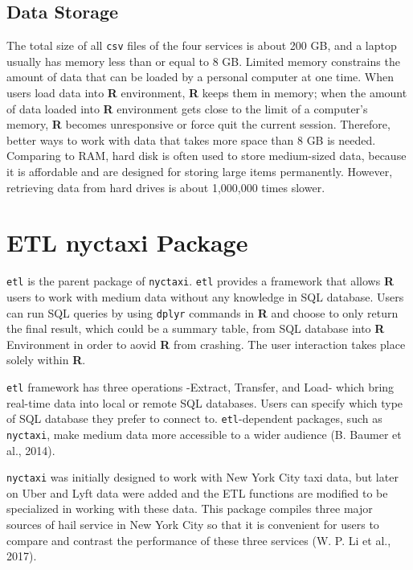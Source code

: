\documentclass[12pt,twoside]{reedthesis}
\theoremstyle{definition}
\theoremstyle{definition}
\theoremstyle{definition}
\theoremstyle{remark}
\begin{document}
\subsection{Data Storage}\label{data-storage}

The total size of all \texttt{csv} files of the four services is about
200 GB, and a laptop usually has memory less than or equal to 8 GB.
Limited memory constrains the amount of data that can be loaded by a
personal computer at one time. When users load data into \textbf{R}
environment, \textbf{R} keeps them in memory; when the amount of data
loaded into \textbf{R} environment gets close to the limit of a
computer's memory, \textbf{R} becomes unresponsive or force quit the
current session. Therefore, better ways to work with data that takes
more space than 8 GB is needed. Comparing to RAM, hard disk is often
used to store medium-sized data, because it is affordable and are
designed for storing large items permanently. However, retrieving data
from hard drives is about 1,000,000 times slower.

\section{ETL nyctaxi Package}\label{etl-nyctaxi-package}

\texttt{etl} is the parent package of \texttt{nyctaxi}. \texttt{etl}
provides a framework that allows \textbf{R} users to work with medium
data without any knowledge in SQL database. Users can run SQL queries by
using \texttt{dplyr} commands in \textbf{R} and choose to only return
the final result, which could be a summary table, from SQL database into
\textbf{R} Environment in order to aovid \textbf{R} from crashing. The
user interaction takes place solely within \textbf{R}.

\texttt{etl} framework has three operations -Extract, Transfer, and
Load- which bring real-time data into local or remote SQL databases.
Users can specify which type of SQL database they prefer to connect to.
\texttt{etl}-dependent packages, such as \texttt{nyctaxi}, make medium
data more accessible to a wider audience (B. Baumer et al., 2014).

\texttt{nyctaxi} was initially designed to work with New York City taxi
data, but later on Uber and Lyft data were added and the ETL functions
are modified to be specialized in working with these data. This package
compiles three major sources of hail service in New York City so that it
is convenient for users to compare and contrast the performance of these
three services (W. P. Li et al., 2017).
\end{document}
